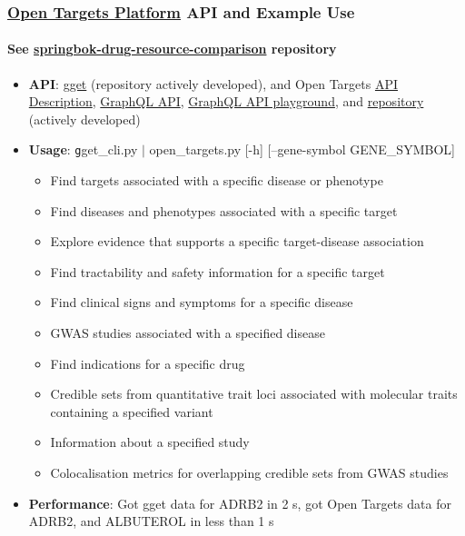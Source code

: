 \documentclass[aspectratio=169,xcolor=dvipsnames]{beamer}
\begin{document}
\begin{frame}
  \frametitle{\href{https://platform-docs.opentargets.org/getting-started}{Open
      Targets Platform} API and Example Use}
  \framesubtitle{See
    \href{https://github.com/ralatsdc/springbok-drug-resource-comparison}{springbok-drug-resource-comparison}
    repository}
  \begin{itemize}\footnotesize
  \item[] \textbf{API}: \href{https://github.com/pachterlab/gget}{gget}
    (repository actively developed), and Open Targets
    \href{https://platform.opentargets.org/api}{API Description},
    \href{https://platform-docs.opentargets.org/data-access/graphql-api}{GraphQL
      API},
    \href{https://api.platform.opentargets.org/api/v4/graphql/browser}{GraphQL
      API playground}, and
    \href{https://github.com/opentargets/platform-api}{repository}
    (actively developed)
    \vspace{0.5\baselineskip}
  \item[] \textbf{Usage}: {\texttt gget\_cli.py $|$ open\_targets.py [-h]
    [--gene-symbol GENE\_SYMBOL]}
    \begin{itemize}\scriptsize
    \item Find targets associated with a specific disease or phenotype
    \item Find diseases and phenotypes associated with a specific
      target
    \item Explore evidence that supports a specific target-disease
      association
    \item Find tractability and safety information for a specific
      target
    \item Find clinical signs and symptoms for a specific disease
    \item GWAS studies associated with a specified disease
    \item Find indications for a specific drug
    \item Credible sets from quantitative trait loci associated with
      molecular traits containing a specified variant
    \item Information about a specified study
    \item Colocalisation metrics for overlapping credible sets from
      GWAS studies
    \end{itemize}
    \vspace{0.5\baselineskip}
  \item[] \textbf{Performance}: Got gget data for ADRB2 in 2 s, got Open
    Targets data for ADRB2, and ALBUTEROL in less than 1 s
  \end{itemize}
\end{frame}
\end{document}
